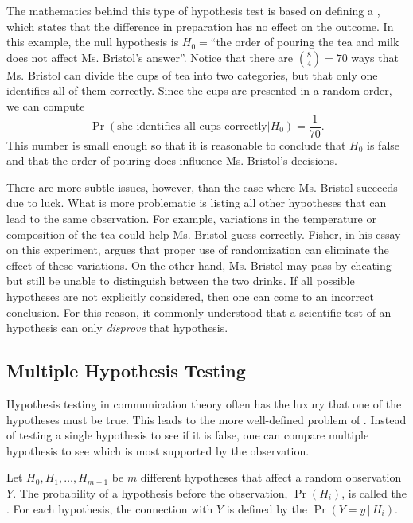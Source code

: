 The mathematics behind this type of hypothesis test is based on defining a , which states that the difference in preparation has no effect on the outcome.
In this example, the null hypothesis is $H_0 = $``the order of pouring the tea and milk does not affect Ms. Bristol's answer''.
Notice that there are $\binom{8}{4}=70$ ways that Ms. Bristol can divide the cups of tea into two categories, but that only one identifies all of them correctly.
Since the cups are presented in a random order, we can compute
\[ \Pr (\text{she identifies all cups correctly} | H_0) = \frac{1}{70}. \]
This number is small enough so that it is reasonable to conclude that $H_0$ is false and that the order of pouring does influence Ms. Bristol's decisions.

There are more subtle issues, however, than the case where Ms. Bristol succeeds due to luck.
What is more problematic is listing all other hypotheses that can lead to the same observation.
For example, variations in the temperature or composition of the tea could help Ms. Bristol guess correctly.
Fisher, in his essay on this experiment, argues that proper use of randomization can eliminate the effect of these variations.
On the other hand, Ms. Bristol may pass by cheating but still be unable to distinguish between the two drinks.
If all possible hypotheses are not explicitly considered, then one can come to an incorrect conclusion.
For this reason, it commonly understood that a scientific test of an hypothesis can only \emph{disprove} that hypothesis.

\subsection{Multiple Hypothesis Testing}

Hypothesis testing in communication theory often has the luxury that one of the hypotheses must be true.
This leads to the more well-defined problem of .
Instead of testing a single hypothesis to see if it is false, one can compare multiple hypothesis to see which is most supported by the observation.

Let $H_0,H_1,\ldots,H_{m-1}$ be $m$ different hypotheses that affect a random observation $Y$.
The probability of a hypothesis before the observation, $\Pr(H_i)$, is called the .
For each hypothesis, the connection with $Y$ is defined by the  $\Pr (Y=y \, | \, H_i)$.


